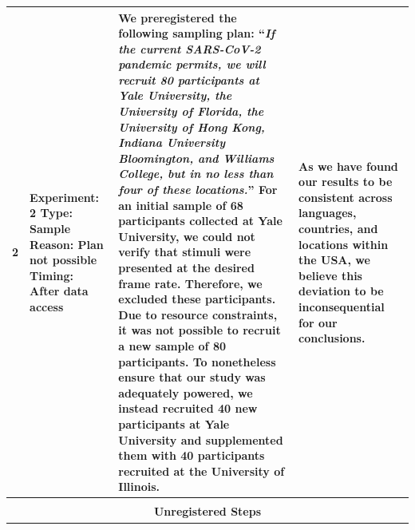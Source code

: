 \documentclass[
  man,floatsintext]{apa6}
\newenvironment{lltable}{\begin{landscape}\centering\begin{ThreePartTable}}{\end{ThreePartTable}\end{landscape}}
\begin{document}
\begin{lltable}
{\begin{longtable}{cp{3.25cm}p{10cm}p{6.75cm}}
2 & Experiment: 2 \newline Type: Sample \newline Reason: Plan not possible \newline Timing: After data access & We preregistered the following sampling plan: \newline \newline  ``\textit{If the current SARS-CoV-2 pandemic permits, we will recruit 80 participants at Yale University, the University of Florida, the University of Hong Kong, Indiana University Bloomington, and Williams College, but in no less than four of these locations.}'' \newline \newline For an initial sample of 68 participants collected at Yale University, we could not verify that stimuli were presented at the desired frame rate. Therefore, we excluded these participants. Due to resource constraints, it was not possible to recruit a new sample of 80 participants. To nonetheless ensure that our study was adequately powered, we instead recruited 40 new participants at Yale University and supplemented them with 40 participants recruited at the University of Illinois. & As we have found our results to be consistent across languages, countries, and locations within the USA, we believe this deviation to be inconsequential for our conclusions.\\ \midrule
 &  & \phantom{a} \newline \phantom{a} \newline\phantom{a} \newline\phantom{a} \newline\phantom{a} \newline & \\
\multicolumn{4}{c}{\textbf{Unregistered Steps}}\\ \midrule

\end{longtable}}
\end{lltable}
\end{document}
